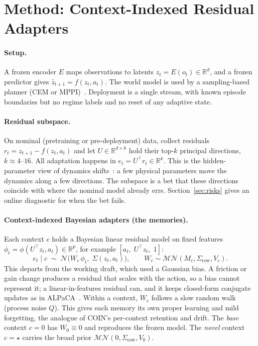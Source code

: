 \documentclass[10pt]{article}
\newcommand{\N}{\mathcal{N}}
\newcommand{\novel}{\star}
\begin{document}
\section{Method: Context-Indexed Residual Adapters}

\paragraph{Setup.}
A frozen encoder $E$ maps observations to latents $z_t=E(o_t)\in\mathbb{R}^d$, and a frozen predictor
gives $\hat z_{t+1}=f(z_t,a_t)$. The world model is used by a sampling-based planner (CEM or
MPPI)~\cite{rubinstein1999cem,chua2018pets}. Deployment is a single stream, with known episode
boundaries but no regime labels and no reset of any adaptive state.

\paragraph{Residual subspace.}
On nominal (pretraining or pre-deployment) data, collect residuals $r_t=z_{t+1}-f(z_t,a_t)$ and let
$U\in\mathbb{R}^{d\times k}$ hold their top-$k$ principal directions, $k\approx 4$--$16$. All adaptation
happens in $e_t=U^\top r_t\in\mathbb{R}^k$. This is the hidden-parameter view of dynamics
shifts~\cite{doshivelez2016hipmdp}: a few physical parameters move the dynamics along a few
directions. The subspace is a bet that these directions coincide with where the nominal model already
errs. Section~\ref{sec:risks} gives an online diagnostic for when the bet fails.

\paragraph{Context-indexed Bayesian adapters (the memories).}
Each context $c$ holds a Bayesian linear residual model on fixed features
$\phi_t=\phi(U^\top z_t, a_t)\in\mathbb{R}^p$, for example $[a_t,\;U^\top z_t,\;1]$:
\begin{equation}
  e_t \mid c \;\sim\; \N\!\big(W_c\,\phi_t,\; \Sigma(z_t,a_t)\big),\qquad
  W_c \sim \mathcal{MN}(M_c, \Sigma_{\text{row}}, V_c).
  \label{eq:adapter}
\end{equation}
This departs from the working draft, which used a Gaussian bias. A friction or gain change produces a
residual that scales with the action, so a bias cannot represent it; a linear-in-features residual can,
and it keeps closed-form conjugate updates as in ALPaCA~\cite{harrison2018alpaca}. Within a context,
$W_c$ follows a slow random walk (process noise $Q$). This gives each memory its own proper learning
and mild forgetting, the analogue of COIN's per-context retention and drift. The \emph{base} context
$c=0$ has $W_0\equiv 0$ and reproduces the frozen model. The \emph{novel} context $c=\novel$ carries
the broad prior $\mathcal{MN}(0,\Sigma_{\text{row}},V_0)$.
\end{document}
